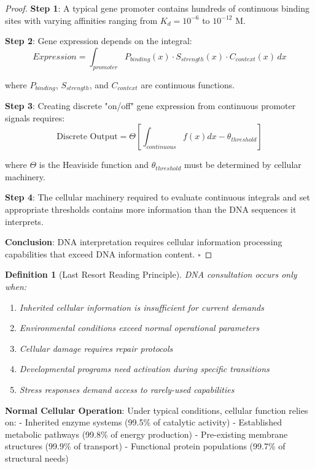 \documentclass[12pt,a4paper]{article}
\newtheorem{definition}[theorem]{Definition}
\begin{document}
\begin{proof}
\textbf{Step 1}: A typical gene promoter contains hundreds of continuous binding sites with varying affinities ranging from $K_d = 10^{-6}$ to $10^{-12}$ M.

\textbf{Step 2}: Gene expression depends on the integral:
$$Expression = \int_{promoter} P_{binding}(x) \cdot S_{strength}(x) \cdot C_{context}(x) \, dx$$

where $P_{binding}$, $S_{strength}$, and $C_{context}$ are continuous functions.

\textbf{Step 3}: Creating discrete "on/off" gene expression from continuous promoter signals requires:
$$\text{Discrete Output} = \Theta\left[\int_{continuous} f(x) dx - \theta_{threshold}\right]$$

where $\Theta$ is the Heaviside function and $\theta_{threshold}$ must be determined by cellular machinery.

\textbf{Step 4}: The cellular machinery required to evaluate continuous integrals and set appropriate thresholds contains more information than the DNA sequences it interprets.

\textbf{Conclusion}: DNA interpretation requires cellular information processing capabilities that exceed DNA information content. $\square$
\end{proof}

\begin{definition}[Last Resort Reading Principle]
DNA consultation occurs only when:
\begin{enumerate}
\item Inherited cellular information is insufficient for current demands
\item Environmental conditions exceed normal operational parameters
\item Cellular damage requires repair protocols
\item Developmental programs need activation during specific transitions
\item Stress responses demand access to rarely-used capabilities
\end{enumerate}
\end{definition}

\textbf{Normal Cellular Operation}: Under typical conditions, cellular function relies on:
- Inherited enzyme systems (99.5\% of catalytic activity)
- Established metabolic pathways (99.8\% of energy production)
- Pre-existing membrane structures (99.9\% of transport)
- Functional protein populations (99.7\% of structural needs)
\end{document}
